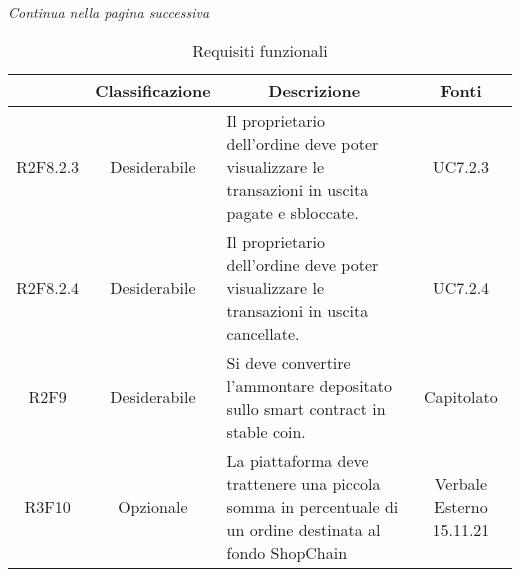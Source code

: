 \begin{center}
    \textit{\small Continua nella pagina successiva}
\end{center} 
\begin{table}[H]
    \centering
    \renewcommand{\arraystretch}{1.8}
    \begin{tabular}{c | c | p{6cm} | c}
        \rowcolor[HTML]{125E28} 
        \multicolumn{1}{c}{\color[HTML]{FFFFFF} \textbf{Codice}} & 
		\multicolumn{1}{c}{\color[HTML]{FFFFFF} \textbf{Classificazione}} & 
		\multicolumn{1}{c}{\color[HTML]{FFFFFF} \textbf{Descrizione}} & 
		\multicolumn{1}{c}{\color[HTML]{FFFFFF} \textbf{Fonti}} \\
        \hline
        R2F8.2.3 & Desiderabile & Il proprietario dell'ordine deve poter visualizzare le transazioni in uscita pagate e sbloccate. & UC7.2.3 \\
        R2F8.2.4 & Desiderabile & Il proprietario dell'ordine deve poter visualizzare le transazioni in uscita cancellate. & UC7.2.4 \\
        R2F9 & Desiderabile & Si deve convertire l'ammontare depositato sullo smart contract in stable coin. & Capitolato \\
        R3F10 & Opzionale & La piattaforma deve trattenere una piccola somma in percentuale di un ordine destinata al fondo ShopChain & Verbale Esterno 15.11.21 \\
    \end{tabular}
    \caption{Requisiti funzionali}
\end{table}

